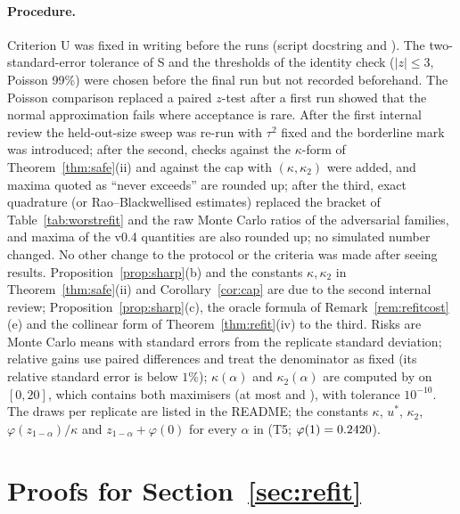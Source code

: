 \documentclass[10pt,a4paper]{article}
\theoremstyle{plain}
\theoremstyle{definition}
\theoremstyle{remark}
\begin{document}
\paragraph{Procedure.} Criterion U was fixed in writing before the runs (script docstring and ). The two-standard-error tolerance of S and the thresholds of the identity check ($|z|\le3$, Poisson 99\%) were chosen before the final run but not recorded beforehand. The Poisson comparison replaced a paired $z$-test after a first run showed that the normal approximation fails where acceptance is rare. After the first internal review the held-out-size sweep was re-run with $\tau^2$ fixed and the borderline mark was introduced; after the second, checks against the $\kappa$-form of Theorem~\ref{thm:safe}(ii) and against the cap with $(\kappa,\kappa_2)$ were added, and maxima quoted as ``never exceeds'' are rounded up; after the third, exact quadrature (or Rao--Blackwellised estimates) replaced the bracket of Table~\ref{tab:worstrefit} and the raw Monte Carlo ratios of the adversarial families, and maxima of the v0.4 quantities are also rounded up; no simulated number changed. No other change to the protocol or the criteria was made after seeing results. Proposition~\ref{prop:sharp}(b) and the constants $\kappa,\kappa_2$ in Theorem~\ref{thm:safe}(ii) and Corollary~\ref{cor:cap} are due to the second internal review; Proposition~\ref{prop:sharp}(c), the oracle formula of Remark~\ref{rem:refitcost}(e) and the collinear form of Theorem~\ref{thm:refit}(iv) to the third. Risks are Monte Carlo means with standard errors from the replicate standard deviation; relative gains use paired differences and treat the denominator as fixed (its relative standard error is below $1\%$); $\kappa(\alpha)$ and $\kappa_2(\alpha)$ are computed by  on $[0,20]$, which contains both maximisers (at most \UStarMax{} and \UTwoStarMax), with tolerance $10^{-10}$. The draws per replicate are listed in the README; the constants $\kappa$, $u^\ast$, $\kappa_2$, $\varphi(z_{1-\alpha})/\kappa$ and $z_{1-\alpha}+\varphi(0)$ for every $\alpha$ in  (T5; $\varphi(1)=0.2420$).


\section{Proofs for Section~\ref{sec:refit}}\label{app:proofs}
\end{document}

